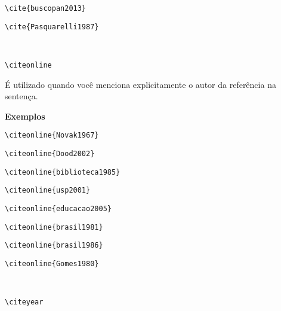 \begin{alineas}
\begin{verbatim}
\cite{buscopan2013}
\end{verbatim}
\cite{buscopan2013}

\begin{verbatim}
\cite{Pasquarelli1987}
\end{verbatim}
\cite{Pasquarelli1987}\\

\item
\begin{verbatim}
\citeonline
\end{verbatim}

É utilizado quando voc\^e menciona explicitamente o autor da refer\^encia na sentença.

\textbf{Exemplos}

\begin{verbatim}
\citeonline{Novak1967}
\end{verbatim}

\begin{verbatim}
\citeonline{Dood2002}
\end{verbatim}

\begin{verbatim}
\citeonline{biblioteca1985}
\end{verbatim}

\begin{verbatim}
\citeonline{usp2001}
\end{verbatim}

\begin{verbatim}
\citeonline{educacao2005}
\end{verbatim}

\begin{verbatim}
\citeonline{brasil1981}
\end{verbatim}

\begin{verbatim}
\citeonline{brasil1986}
\end{verbatim}

\begin{verbatim}
\citeonline{Gomes1980}
\end{verbatim}
\\

\item
\begin{verbatim}
\citeyear
\end{verbatim}


\end{alineas}
